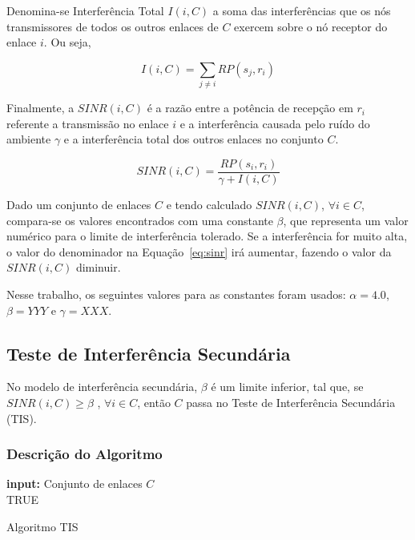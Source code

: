 Denomina-se Interferência Total $I(i,C)$ a soma das interferências que os nós transmissores de todos os outros enlaces de $C$ exercem sobre o nó receptor do enlace $i$. Ou seja,

\begin{equation}
I(i,C) = \sum_{j \neq i} RP(s_{j},r_{i})
\end{equation}

Finalmente, a $SINR(i,C)$ é a razão entre a potência de recepção em $r_{i}$ referente a transmissão no enlace $i$ e a interferência causada pelo ruído do ambiente $\gamma$ e a interferência total dos outros enlaces no conjunto $C$.

\begin{equation}
SINR(i,C) = \frac{RP(s_{i},r_{i})} {\gamma + I(i,C)}
\label{eq:sinr}  
\end{equation}

Dado um conjunto de enlaces $C$ e tendo calculado $SINR(i,C)$, $\forall i \in C$, compara-se os valores encontrados com uma constante $\beta$, que representa um valor numérico para o limite de interferência tolerado. Se a interferência for muito alta, o valor do denominador na Equação~\ref{eq:sinr} irá aumentar, fazendo o valor da $SINR(i,C)$ diminuir. 

Nesse trabalho, os seguintes valores para as constantes foram usados: $\alpha = 4.0$, $\beta = YYY$ e $\gamma=XXX$. %

\subsection{Teste de Interferência Secundária}

No modelo de interferência secundária, $\beta$ é um limite inferior, tal que, se $SINR(i,C) \geq \beta$ , $\forall i \in C$, então $C$ passa no Teste de Interferência Secundária (TIS).

\subsubsection{Descrição do Algoritmo}

\begin{algorithm}[h]
	\SetVline
	{\bf input:} Conjunto de enlaces $C$\\
	\Return TRUE
\caption{Algoritmo TIS}
\label{alg:tis}
\end{algorithm}

